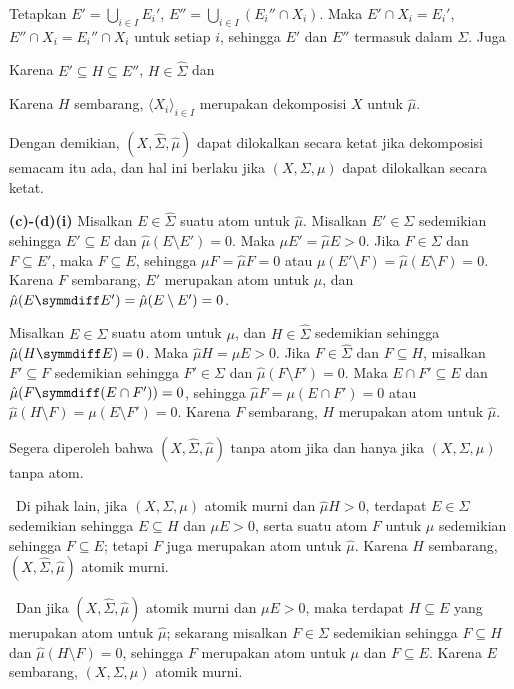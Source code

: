 {

\noindent Tetapkan $E'=\bigcup_{i\in I}E_i'$,
$E''=\bigcup_{i\in I}(E_i''\cap X_i)$. Maka $E'\cap X_i=E_i'$,
$E''\cap X_i=E_i''\cap X_i$ untuk setiap $i$, sehingga $E'$ dan $E''$
termasuk dalam $\Sigma$. Juga


\noindent Karena $E'\subseteq H\subseteq E''$, $H\in\hat\Sigma$ dan


\noindent Karena $H$ sembarang, $\langle X_i\rangle_{i\in I}$
merupakan dekomposisi $X$ untuk $\hat\mu$.

Dengan demikian, $(X,\hat\Sigma,\hat\mu)$ dapat dilokalkan secara ketat
jika dekomposisi semacam itu ada, dan hal ini berlaku jika
$(X,\Sigma,\mu)$ dapat dilokalkan secara ketat.

\medskip

{\bf (c)-(d)(i)} Misalkan $E\in\hat\Sigma$ suatu atom untuk $\hat\mu$.
Misalkan $E'\in\Sigma$ sedemikian sehingga $E'\subseteq E$ dan
$\hat\mu(E\setminus E')=0$. Maka $\mu E'=\hat\mu E>0$. Jika
$F\in\Sigma$ dan $F\subseteq E'$, maka $F\subseteq E$, sehingga
$\mu F=\hat\mu F=0$ atau $\mu(E'\setminus F)=\hat\mu(E\setminus F)=0$.
Karena $F$ sembarang, $E'$ merupakan atom untuk $\mu$, dan
$\hat\mu(E\symmdiff E')=\hat\mu(E\setminus E')=0$.

\medskip

 Misalkan $E\in\Sigma$ suatu atom untuk $\mu$, dan
$H\in\hat\Sigma$ sedemikian sehingga $\hat\mu(H\symmdiff E)=0$. Maka
$\hat\mu H=\mu E>0$. Jika $F\in\hat\Sigma$ dan $F\subseteq H$,
misalkan $F'\subseteq F$ sedemikian sehingga $F'\in\Sigma$ dan
$\hat\mu(F\setminus F')=0$. Maka $E\cap F'\subseteq E$ dan
$\hat\mu(F\symmdiff(E\cap F'))=0$, sehingga $\hat\mu F=\mu(E\cap F')=0$
atau $\hat\mu(H\setminus F)=\mu(E\setminus F')=0$. Karena $F$
sembarang, $H$ merupakan atom untuk $\hat\mu$.

\medskip

 Segera diperoleh bahwa $(X,\hat\Sigma,\hat\mu)$ tanpa
atom jika dan hanya jika $(X,\Sigma,\mu)$ tanpa atom.

\medskip

\grheada\ Di pihak lain, jika $(X,\Sigma,\mu)$ atomik
murni dan $\hat\mu H>0$, terdapat $E\in\Sigma$ sedemikian sehingga
$E\subseteq H$ dan $\mu E>0$, serta suatu atom $F$ untuk $\mu$
sedemikian sehingga $F\subseteq E$; tetapi $F$ juga merupakan atom untuk
$\hat\mu$. Karena $H$ sembarang, $(X,\hat\Sigma,\hat\mu)$ atomik murni.

\medskip

\qquad\grheadb\ Dan jika $(X,\hat\Sigma,\hat\mu)$ atomik murni dan
$\mu E>0$, maka terdapat $H\subseteq E$ yang merupakan atom untuk
$\hat\mu$; sekarang misalkan $F\in\Sigma$ sedemikian sehingga
$F\subseteq H$ dan $\hat\mu(H\setminus F)=0$, sehingga $F$ merupakan
atom untuk $\mu$ dan $F\subseteq E$. Karena $E$ sembarang,
$(X,\Sigma,\mu)$ atomik murni.
}%

